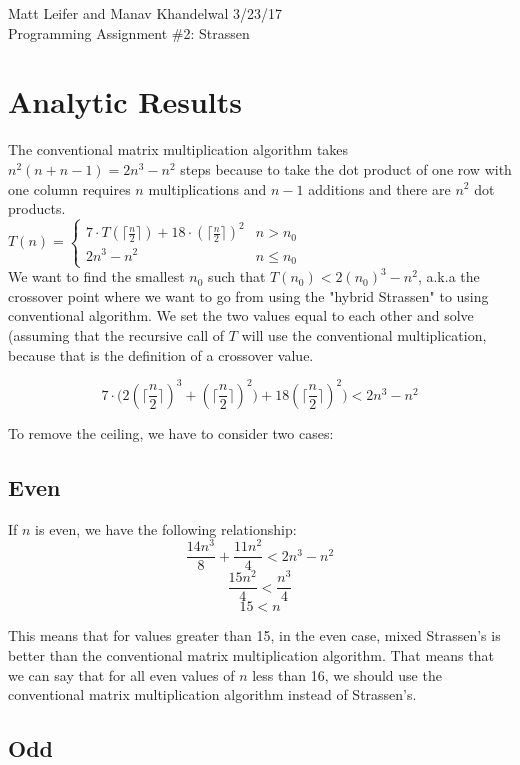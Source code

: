 \documentclass{article}
\begin{document}
	
	\noindent Matt Leifer and Manav Khandelwal \hspace{4.0in} 3/23/17 \\
	Programming Assignment \#2: Strassen \\
	
	\section{Analytic Results}
	The conventional matrix multiplication algorithm takes $n^2(n + n - 1) = 2n^3 - n^2$ steps because to take the dot product of one row with one column requires $n$ multiplications and $n - 1$ additions and there are $n^2$ dot products. \\
	\noindent
	$T(n) = 
	\begin{cases}
	7\cdot T(\lceil \frac{n}{2} \rceil) + 18 \cdot (\lceil \frac{n}{2} \rceil) ^ 2 & n > n_0 \\
	2n^3-n^2 & n \leq n_0
	\end{cases}
	$
	\\
	We want to find the smallest $n_0$ such that $T(n_0) < 2(n_0)^3 - n^2$, a.k.a the crossover point where we want to go from using the "hybrid Strassen" to using conventional algorithm. We set the two values equal to each other and solve (assuming that the recursive call of $T$ will use the conventional multiplication, because that is the definition of a crossover value.
	
	\[7 \cdot \big(2 (\lceil \frac{n}{2} \rceil)^3 + (\lceil \frac{n}{2} \rceil)^2 \big) + 18 (\lceil \frac{n}{2} \rceil)^2 \big) < 2 n^3 - n^2 \]
	
	To remove the ceiling, we have to consider two cases:
	
	\subsection{Even}
	
	If $n$ is even, we have the following relationship:
	\[\frac{14 n^3}{8} + \frac{11 n^2}{4} < 2 n^3 - n^2 \]
	\[\frac{15 n^2}{4} < \frac{n^3}{4} \]
	\[15 < n \]
	
	\noindent This means that for values greater than 15, in the even case, mixed Strassen's is better than the conventional matrix multiplication algorithm. That means that we can say that for all even values of $n$ less than 16, we should use the conventional matrix multiplication algorithm instead of Strassen's.
	
	\subsection{Odd}
	
\end{document}
